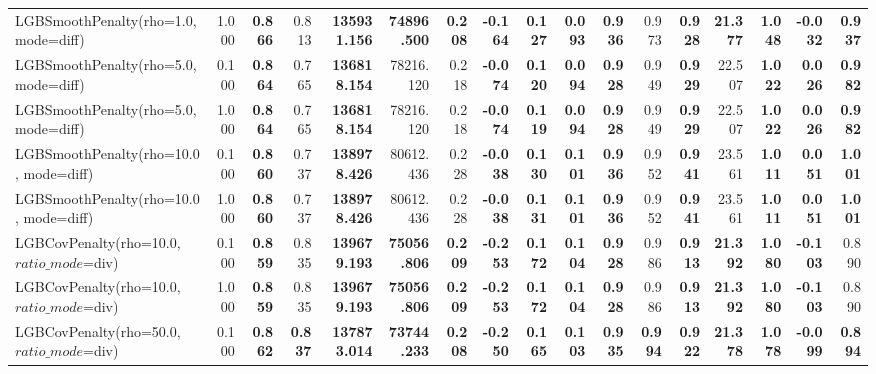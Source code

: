 \documentclass[11pt]{article}
\theoremstyle{plain}
\theoremstyle{definition}
\newcommand{\1}{\mathbf{1}}
\begin{document}
\begin{table}[htbp]
{\begin{tabular}{lrrrrrrrrrrrrrrrr}
LGBSmoothPenalty(rho=1.0, mode=diff) & 1.000 & \textbf{0.866} & 0.813 & \textbf{135931.156} & \textbf{74896.500} & \textbf{0.208} & \textbf{-0.164} & \textbf{0.127} & \textbf{0.093} & \textbf{0.936} & 0.973 & \textbf{0.928} & \textbf{21.377} & \textbf{1.048} & \textbf{-0.032} & \textbf{0.937} \\
LGBSmoothPenalty(rho=5.0, mode=diff) & 0.100 & \textbf{0.864} & 0.765 & \textbf{136818.154} & 78216.120 & 0.218 & \textbf{-0.074} & \textbf{0.120} & \textbf{0.094} & \textbf{0.928} & 0.949 & \textbf{0.929} & 22.507 & \textbf{1.022} & \textbf{0.026} & \textbf{0.982} \\
LGBSmoothPenalty(rho=5.0, mode=diff) & 1.000 & \textbf{0.864} & 0.765 & \textbf{136818.154} & 78216.120 & 0.218 & \textbf{-0.074} & \textbf{0.119} & \textbf{0.094} & \textbf{0.928} & 0.949 & \textbf{0.929} & 22.507 & \textbf{1.022} & \textbf{0.026} & \textbf{0.982} \\
LGBSmoothPenalty(rho=10.0, mode=diff) & 0.100 & \textbf{0.860} & 0.737 & \textbf{138978.426} & 80612.436 & 0.228 & \textbf{-0.038} & \textbf{0.130} & \textbf{0.101} & \textbf{0.936} & 0.952 & \textbf{0.941} & 23.561 & \textbf{1.011} & \textbf{0.051} & \textbf{1.001} \\
LGBSmoothPenalty(rho=10.0, mode=diff) & 1.000 & \textbf{0.860} & 0.737 & \textbf{138978.426} & 80612.436 & 0.228 & \textbf{-0.038} & \textbf{0.131} & \textbf{0.101} & \textbf{0.936} & 0.952 & \textbf{0.941} & 23.561 & \textbf{1.011} & \textbf{0.051} & \textbf{1.001} \\
LGBCovPenalty(rho=10.0, $ratio\_mode$=div) & 0.100 & \textbf{0.859} & 0.835 & \textbf{139679.193} & \textbf{75056.806} & \textbf{0.209} & \textbf{-0.253} & \textbf{0.172} & \textbf{0.104} & \textbf{0.928} & 0.986 & \textbf{0.913} & \textbf{21.392} & \textbf{1.080} & \textbf{-0.103} & 0.890 \\
LGBCovPenalty(rho=10.0, $ratio\_mode$=div) & 1.000 & \textbf{0.859} & 0.835 & \textbf{139679.193} & \textbf{75056.806} & \textbf{0.209} & \textbf{-0.253} & \textbf{0.172} & \textbf{0.104} & \textbf{0.928} & 0.986 & \textbf{0.913} & \textbf{21.392} & \textbf{1.080} & \textbf{-0.103} & 0.890 \\
LGBCovPenalty(rho=50.0, $ratio\_mode$=div) & 0.100 & \textbf{0.862} & \textbf{0.837} & \textbf{137873.014} & \textbf{73744.233} & \textbf{0.208} & \textbf{-0.250} & \textbf{0.165} & \textbf{0.103} & \textbf{0.935} & \textbf{0.994} & \textbf{0.922} & \textbf{21.378} & \textbf{1.078} & \textbf{-0.099} & \textbf{0.894} \\

\end{tabular}}
\end{table}
\end{document}
